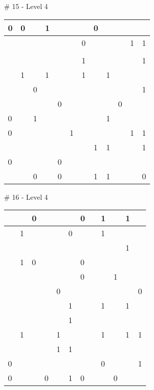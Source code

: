 \medskip

\# 15 - Level 4 \newline
\begin{tabular}{|m{\collen}|m{\collen}|m{\collen}|m{\collen}|m{\collen}|m{\collen}|m{\collen}|m{\collen}|m{\collen}|m{\collen}|m{\collen}|m{\collen}|}
\hline
  0 & 0 &   & 1 &   &   &   & 0 &   &   &   &   \\
\hline
    &   &   &   &   &   & 0 &   &   &   & 1 & 1 \\
\hline
    &   &   &   &   &   &   &   &   &   &   &   \\
\hline
    &   &   &   &   &   & 1 &   &   &   &   & 1 \\
\hline
    & 1 &   & 1 &   &   & 1 &   & 1 &   &   &   \\
\hline
    &   & 0 &   &   &   &   &   &   &   &   & 1 \\
\hline
    &   &   &   & 0 &   &   &   &   & 0 &   &   \\
\hline
  0 &   & 1 &   &   &   &   &   & 1 &   &   &   \\
\hline
  0 &   &   &   &   & 1 &   &   &   &   & 1 & 1 \\
\hline
    &   &   &   &   &   &   & 1 & 1 &   &   & 1 \\
\hline
  0 &   &   &   & 0 &   &   &   &   &   &   &   \\
\hline
    &   & 0 &   & 0 &   &   & 1 & 1 &   &   & 0 \\
\hline
\end{tabular}


\medskip

\# 16 - Level 4 \newline
\begin{tabular}{|m{\collen}|m{\collen}|m{\collen}|m{\collen}|m{\collen}|m{\collen}|m{\collen}|m{\collen}|m{\collen}|m{\collen}|m{\collen}|m{\collen}|}
\hline
    &   & 0 &   &   &   & 0 &   & 1 &   & 1 &   \\
\hline
    & 1 &   &   &   & 0 &   &   & 1 &   &   &   \\
\hline
    &   &   &   &   &   &   &   &   &   & 1 &   \\
\hline
    & 1 & 0 &   &   &   & 0 &   &   &   &   &   \\
\hline
    &   &   &   &   &   & 0 &   &   & 1 &   &   \\
\hline
    &   &   &   & 0 &   &   &   &   &   &   & 0 \\
\hline
    &   &   &   &   & 1 &   &   & 1 &   & 1 &   \\
\hline
    &   &   &   &   & 1 &   &   &   &   &   &   \\
\hline
    & 1 &   &   & 1 &   &   &   & 1 &   & 1 & 1 \\
\hline
    &   &   &   & 1 & 1 &   &   &   &   &   &   \\
\hline
  0 &   &   &   &   &   &   &   & 0 &   &   & 1 \\
\hline
  0 &   &   & 0 &   & 1 & 0 &   &   & 0 &   &   \\
\hline
\end{tabular}


